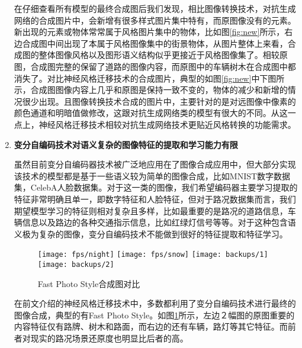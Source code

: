 \begin{enumerate}[itemindent=40pt, listparindent = 0.7cm, label={发现\arabic*:}]
    在仔细查看所有模型的最终合成图后我们发现，相比图像转换技术，对抗生成网络的合成图片中，会新增有很多样式图片集中特有，而原图像没有的元素。新出现的元素或物体常常属于风格图片集中的物体，比如图\ref{fig:new}所示，右边合成图中间出现了本属于风格图像集中的街景物体，从图片整体上来看，合成图的整体图像风格以及图形语义结构似乎更接近于风格图像集了。相较原图，合成图完整的保留了道路的图像内容，而原图中的车辆树木在合成图中都消失了。对比神经风格迁移技术的合成图片，典型的如图\ref{fig:new}中下图所示，合成图图像内容上几乎和原图是保持一致不变的，物体的减少和新增的情况很少出现。且图像转换技术合成的图片中，主要针对的是对远图像中像素的颜色通道和明暗值做修改，这跟对抗生成网络类的模型有很大的不同。从这一点上，神经风格迁移技术相较对抗生成网络技术更贴近风格转换的功能需求。

    \item \textbf{变分自编码技术对语义复杂的图像特征的提取和学习能力有限}

    虽然目前变分自编码器技术被广泛地应用在了图像合成应用中，但大部分实现该技术的模型都是基于一些语义较为简单的图像合成，比如MNIST数字数据集，CelebA人脸数据集。对于这一类的图像，我们希望编码器主要学习提取的特征非常明确且单一，即数字特征和人脸特征，但对于路况数据集而言，我们期望模型学习的特征则相对复杂且多样，比如最重要的是路况的道路信息，车辆信息以及路边的各种交通指示信息，比如红绿灯信号等等。对于这种包含语义极为复杂的图像，变分自编码技术不能做到很好的特征提取和特征学习\cite{vae}。
    
    \begin{figure}[h]
        \centering
        \texttt{[image: fps/night]}
        \texttt{[image: fps/snow]}
        \texttt{[image: backups/1]}
        \texttt{[image: backups/2]}
        \caption{Fast Photo Style合成图对比}
        \label{fps:com}
    \end{figure}

    在前文介绍的神经风格迁移技术中，多数都利用了变分自编码技术进行最终的图像合成，典型的有Fast Photo Style。如图\ref{fps:com}所示，左边２幅图的原图重要的内容特征仅有路牌、树木和路面，而右边的还有车辆，路灯等其它特征。而前者对现实的路况场景还原度也明显比后者的高。

\end{enumerate}